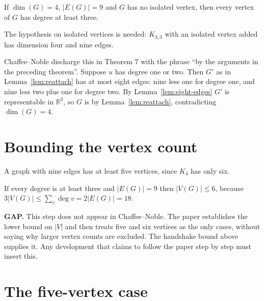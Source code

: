 \begin{lemma}
  \label{lem:min-degree}
  \leanok
  If $\dim(G) = 4$, $|E(G)| = 9$ and $G$ has no isolated vertex, then every vertex of $G$ has
  degree at least three.

  The hypothesis on isolated vertices is needed: $K_{3,3}$ with an isolated vertex added has
  dimension four and nine edges.

  Chaffee--Noble discharge this in Theorem 7 with the phrase ``by the arguments in the preceding
  theorem''. Suppose $u$ has degree one or two. Then $G'$ as in Lemma~\ref{lem:reattach} has at
  most eight edges: nine less one for degree one, and nine less two plus one for degree two. By
  Lemma~\ref{lem:eight-edges} $G'$ is representable in $\mathbb{R}^3$, so $G$ is by
  Lemma~\ref{lem:reattach}, contradicting $\dim(G) = 4$.
\end{lemma}

\section{Bounding the vertex count}

\begin{lemma}
  \label{lem:at-least-five}
  \leanok
  A graph with nine edges has at least five vertices, since $K_4$ has only six.
\end{lemma}

\begin{lemma}
  \label{lem:at-most-six}
  \leanok
  If every degree is at least three and $|E(G)| = 9$ then $|V(G)| \le 6$, because
  $3\lvert V(G)\rvert \le \sum_{v} \deg v = 2\lvert E(G)\rvert = 18$.

  \textbf{GAP.} This step does not appear in Chaffee--Noble. The paper establishes the lower bound
  on $|V|$ and then treats five and six vertices as the only cases, without saying why larger
  vertex counts are excluded. The handshake bound above supplies it. Any development that claims
  to follow the paper step by step must insert this.
\end{lemma}

\section{The five-vertex case}

